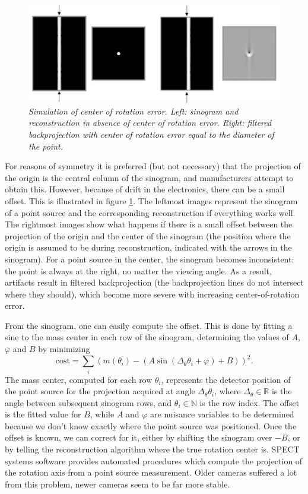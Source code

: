 \begin{figure}[t]
\centering
\includegraphics[width=\figbig]{figs/fig_cor.pdf}
\caption{\label{fig:cor} \emph{Simulation of center of rotation error. Left:
sinogram and reconstruction in absence of center of rotation error. Right:
filtered backprojection with center of rotation error equal to the diameter of
the point.}}
\end{figure}
%
For reasons of symmetry it is preferred (but not necessary) that the
projection of the origin is the central column of the sinogram, and
manufacturers attempt to obtain this. However, because of drift in the
electronics, there can be a small offset. This is illustrated in figure
\ref{fig:cor}. The leftmost images represent the sinogram of a point source
and the corresponding reconstruction if everything works well. The rightmost
images show what happens if there is a small offset between the projection of
the origin and the center of the sinogram (the position where the origin is
assumed to be during reconstruction, indicated with the arrows in the
sinogram). For a point source in the center, the sinogram becomes
inconsistent: the point is always at the right, no matter the viewing
angle. As a result, artifacts result in filtered backprojection (the
backprojection lines do not intersect where they should), which become more
severe with increasing center-of-rotation error.

From the sinogram, one can easily compute the offset. This is done by
fitting a sine to the mass center in each row of the sinogram,
determining the values of $A$, $\varphi$ and $B$ by minimizing
\begin{equation}
 \mbox{cost} = 
  \sum_i \left(m(\theta_i) 
           - (A \sin(\Delta_\theta \theta_i + \varphi) + B)\right)^2.
\end{equation}
The mass center, computed for each row $\theta_i$, represents the
detector position of the point source for the projection acquired at
angle $\Delta_\theta \theta_i$, where $\Delta_\theta \in \mathbb{R}$ is the
angle between subsequent sinogram rows, and $\theta_i \in \mathbb{N}$ is the
row index. The offset is the fitted value for $B$, while $A$ and
$\varphi$ are nuisance variables to be determined because we don't
know exactly where the point source was positioned. Once the offset is
known, we can correct for it, either by shifting the sinogram over $-B$,
or by telling the reconstruction algorithm where the true rotation
center is. SPECT systems software provides automated procedures which
compute the projection of the rotation axis from a point source
measurement. Older cameras suffered a lot from this problem, newer
cameras seem to be far more stable.



